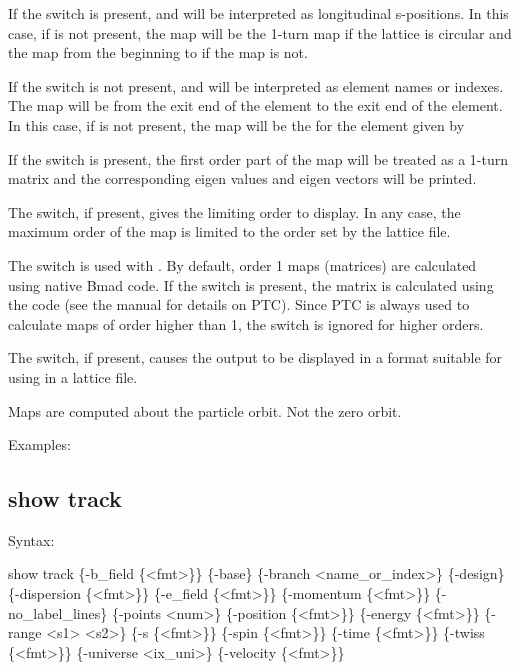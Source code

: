{{{{{{{{{If the  switch is present,  and  will be interpreted as
longitudinal s-positions. In this case, if  is not present, the map will be the
1-turn map if the lattice is circular and the map from the beginning to  if the
map is not.

If the  switch is not present,  and  will be interpreted as
element names or indexes. The map will be from the exit end of the  element to
the exit end of the  element. In this case, if  is not present, the map
will be the for the element given by 

If the  switch is present, the first order part of the map will be treated
as a 1-turn matrix and the corresponding eigen values and eigen vectors will be printed.

The  switch, if present, gives the limiting order to display. In any case, the
maximum order of the map is limited to the order set by the lattice file.

The  switch is used with . By default, order 1 maps (matrices) are calculated
using native Bmad code. If the  switch is present, the matrix is calculated using the
 code (see the \bmad manual for details on PTC). Since PTC is always used to calculate maps
of order higher than 1, the  switch is ignored for higher orders.

The  switch, if present, causes the output to be displayed in a format suitable
for using in a \bmad lattice file.

Maps are computed about the particle orbit. Not the zero orbit.

Examples:


\subsection{show track}
\label{s:show.track}

Syntax:
\begin{example}
  show track \{-b_field \{<fmt>\}\} \{-base\} \{-branch <name_or_index>\} \{-design\} 
      \{-dispersion \{<fmt>\}\} \{-e_field \{<fmt>\}\} \{-momentum \{<fmt>\}\} \{-no_label_lines\} 
      \{-points <num>\} \{-position \{<fmt>\}\} \{-energy \{<fmt>\}\} \{-range <s1> <s2>\}
      \{-s \{<fmt>\}\} \{-spin \{<fmt>\}\} \{-time \{<fmt>\}\} \{-twiss \{<fmt>\}\}
      \{-universe <ix_uni>\} \{-velocity \{<fmt>\}\}
\end{example}

}}}}}}}}}
